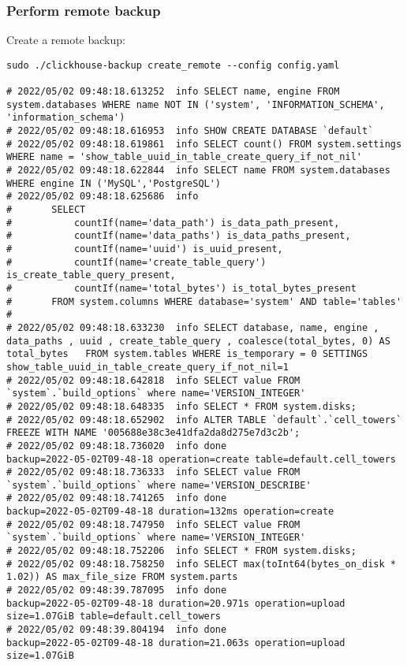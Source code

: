 \subsubsection{Perform remote backup}
\label{sec:orgbcc25d0}
Create a remote backup:
\begin{verbatim}
sudo ./clickhouse-backup create_remote --config config.yaml

# 2022/05/02 09:48:18.613252  info SELECT name, engine FROM system.databases WHERE name NOT IN ('system', 'INFORMATION_SCHEMA', 'information_schema')
# 2022/05/02 09:48:18.616953  info SHOW CREATE DATABASE `default`
# 2022/05/02 09:48:18.619861  info SELECT count() FROM system.settings WHERE name = 'show_table_uuid_in_table_create_query_if_not_nil'
# 2022/05/02 09:48:18.622844  info SELECT name FROM system.databases WHERE engine IN ('MySQL','PostgreSQL')
# 2022/05/02 09:48:18.625686  info
# 		SELECT
# 			countIf(name='data_path') is_data_path_present,
# 			countIf(name='data_paths') is_data_paths_present,
# 			countIf(name='uuid') is_uuid_present,
# 			countIf(name='create_table_query') is_create_table_query_present,
# 			countIf(name='total_bytes') is_total_bytes_present
# 		FROM system.columns WHERE database='system' AND table='tables'
#
# 2022/05/02 09:48:18.633230  info SELECT database, name, engine , data_paths , uuid , create_table_query , coalesce(total_bytes, 0) AS total_bytes   FROM system.tables WHERE is_temporary = 0 SETTINGS show_table_uuid_in_table_create_query_if_not_nil=1
# 2022/05/02 09:48:18.642818  info SELECT value FROM `system`.`build_options` where name='VERSION_INTEGER'
# 2022/05/02 09:48:18.648335  info SELECT * FROM system.disks;
# 2022/05/02 09:48:18.652902  info ALTER TABLE `default`.`cell_towers` FREEZE WITH NAME '005688e38c3e41dfa2da8d275e7d3c2b';
# 2022/05/02 09:48:18.736020  info done                      backup=2022-05-02T09-48-18 operation=create table=default.cell_towers
# 2022/05/02 09:48:18.736333  info SELECT value FROM `system`.`build_options` where name='VERSION_DESCRIBE'
# 2022/05/02 09:48:18.741265  info done                      backup=2022-05-02T09-48-18 duration=132ms operation=create
# 2022/05/02 09:48:18.747950  info SELECT value FROM `system`.`build_options` where name='VERSION_INTEGER'
# 2022/05/02 09:48:18.752206  info SELECT * FROM system.disks;
# 2022/05/02 09:48:18.758250  info SELECT max(toInt64(bytes_on_disk * 1.02)) AS max_file_size FROM system.parts
# 2022/05/02 09:48:39.787095  info done                      backup=2022-05-02T09-48-18 duration=20.971s operation=upload size=1.07GiB table=default.cell_towers
# 2022/05/02 09:48:39.804194  info done                      backup=2022-05-02T09-48-18 duration=21.063s operation=upload size=1.07GiB
\end{verbatim}

